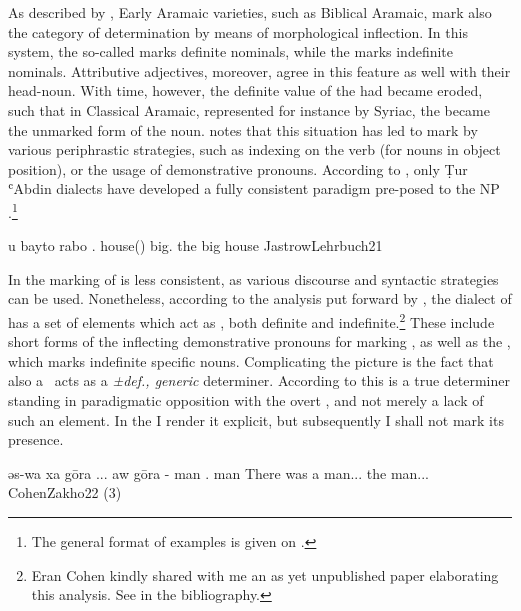 As described by \citet{JastrowDetermination}, {Early Aramaic} varieties, such as {Biblical Aramaic}, mark also the category of determination by means of morphological inflection. In this system, the so-called  marks definite nominals, while the  marks indefinite nominals. Attributive adjectives, moreover, agree in this feature as well with their head-noun. With time, however, the definite value of the  had became eroded, such that in Classical Aramaic, represented for instance by Syriac, the  became the unmarked form of the noun. \citet[146]{JastrowDetermination} notes that this situation has led   to mark   by various periphrastic strategies, such as indexing on the verb (for nouns in object position), or the usage of demonstrative pronouns. According to \citeauthor{JastrowDetermination}, only  Ṭur ʿAbdin dialects have developed a fully consistent  paradigm pre-posed to the NP \citep[see also][20f.]{JastrowLehrbuch}.\footnote{The general format of examples is given on .}

{u\cb{} bayto\cb{} rabo}
{.\masc\cb{} house(\masc)\cb{} big.\masc}
{the big house}
{JastrowLehrbuch}{21}\antipar

\newpage 


In  the marking of  is less consistent, as various discourse and syntactic strategies can be used. Nonetheless, according to the analysis put forward by  \citet[20--27]{CohenZakho}, the dialect of \JZax has a set of elements which act as , both definite and indefinite.\footnote{Eran Cohen kindly shared with me an as yet unpublished paper elaborating this analysis. See \citet{CohenDetermination} in the bibliography.} These include short forms of the inflecting demonstrative pronouns for marking , as well as the  , which marks indefinite specific nouns. Complicating the picture is the fact that also a \zero\ acts as a \emph{±def., generic} determiner. According to \citet[22]{CohenZakho} this is a true determiner standing in paradigmatic opposition with the overt , and not merely a lack of such an element. In the  I render it explicit, but subsequently I shall not mark its presence.

{əs-wa xa gōra ... aw gōra}
{\exist-\pst{} \indef{} man {} .\masc{} man}
{There was a man... the man...}
{CohenZakho}{22 (3)}

